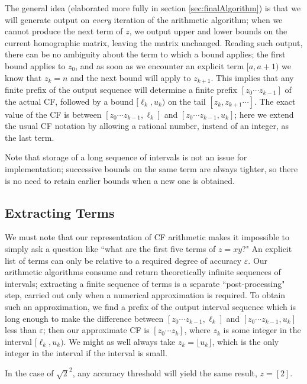\documentclass[11pt, oneside]{amsart}   	%
\renewcommand{\:}{\negthickspace:\negthickspace}
\begin{document}
The general idea (elaborated more fully in section \ref{sec:finalAlgorithm}) is that we will generate output on \emph{every}
 iteration of the arithmetic algorithm; when we cannot produce the next term of $z$, we output upper and lower bounds on the current
 homographic matrix, leaving the matrix unchanged. Reading such output, there can be no ambiguity about the term to which a bound 
 applies; the first bound applies to $z_0$, and as soon as we encounter an explicit term $[a,a+1)$ we know that $z_k=n$ and the next bound will apply to $z_{k+1}$. 
 This implies that any finite prefix of the output sequence will determine a finite prefix $[z_0 \cdots z_{k-1}]$ of the actual CF, followed by a bound
 $[\ell_k,u_k)$ on the tail $[z_k, z_{k+1}\cdots]$. The exact value of the CF is between $[z_0 \cdots z_{k-1}, \ell_k]$ and
 $[z_0 \cdots z_{k-1}, u_k]$; here we extend the usual CF notation by allowing a rational number, instead of an integer, as the last term.

Note that storage of a long sequence of intervals is not an issue for implementation;
successive bounds on the same term are always tighter, so there is no need to retain earlier bounds when a new one is obtained. 

\subsection{Extracting Terms}
We must note that our representation of CF arithmetic makes it impossible to simply ask a question like ``what are the first
five terms of $z = xy$?" An explicit list of terms can only be relative to a required degree of accuracy $\varepsilon$. Our arithmetic
algorithms consume and return theoretically infinite sequences of intervals; extracting a finite sequence of terms is a separate
``post-processing" step, carried out only when a numerical approximation is required.
To obtain such an approximation, we find a prefix of
the output interval sequence which is long enough to make the difference between $[z_0 \cdots z_{k-1}, \ell_k]$ and $[z_0 \cdots
z_{k-1}, u_k]$ less than $\varepsilon$; then our approximate CF is $[z_0 \cdots z_k]$, where $z_k$ is some integer in the interval
$[\ell_k,u_k)$. We might as well always take $z_k = \lfloor u_k \rfloor$, which is the only integer in the interval if the interval is small. 

In the case of $\sqrt{2}^2$, any accuracy threshold will yield the same result, $z = [2]$.
\end{document}
